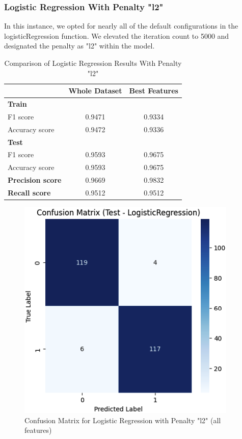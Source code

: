 \documentclass[conference]{IEEEtran}
\begin{document}
\subsubsection{Logistic Regression With Penalty "l2"}

In this instance, we opted for nearly all of the default configurations in the logisticRegression function. We elevated the iteration count to 5000 and designated the penalty as "l2" within the model.

\begin{table}[htbp]
\centering
\begin{tabular}{@{}lcc@{}}
\toprule
 & \textbf{Whole Dataset} & \textbf{Best Features} \\ \midrule
\textbf{Train} &  &  \\
\quad F1 score & 0.9471 & 0.9334 \\
\quad Accuracy score & 0.9472 & 0.9336 \\
\textbf{Test} &  &  \\
\quad F1 score & 0.9593 & 0.9675 \\
\quad Accuracy score & 0.9593 & 0.9675 \\
\textbf{Precision score} & 0.9669 & 0.9832 \\
\textbf{Recall score} & 0.9512 & 0.9512 \\ \bottomrule
\end{tabular}
\caption{Comparison of Logistic Regression Results With Penalty "l2"}
\label{tab:logistic-regression-comparison}
\end{table}

\begin{figure}[H]
    \centering
    \includegraphics[width=1\linewidth]{images/ConfusionMatrixPenaltyAllFeatures.png}
    \caption{Confusion Matrix for Logistic Regression with Penalty "l2" (all features)}
    \label{fig:confusion-matrix-whole-penalty}
\end{figure}
\end{document}
